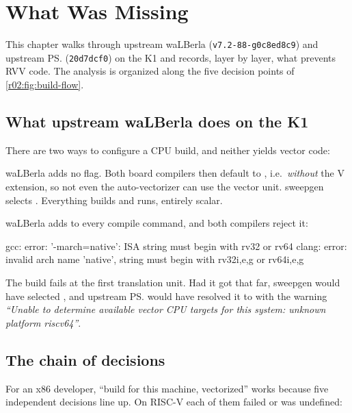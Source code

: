 \chapter{What Was Missing}\label{r02:ch:gap}

This chapter walks through upstream waLBerla (\texttt{v7.2-88-g0c8ed8c9}) and upstream
\ps{} (\texttt{20d7dcf0}) on the K1 and records, layer by layer, what prevents RVV code.
The analysis is organized along the five decision points of \cref{r02:fig:build-flow}.

\section{What upstream waLBerla does on the K1}\label{r02:sec:gap-behaviour}

There are two ways to configure a CPU build, and neither yields vector code:
\begin{description}[style=nextline]
  \item[\cmakeopt{WALBERLA_OPTIMIZE_FOR_LOCALHOST=OFF} (the default)] waLBerla adds no
     flag. Both board compilers then default to
    , i.e.\ \emph{without} the V extension, so not even
    the auto-vectorizer can use the vector unit. sweepgen selects
    . Everything builds and runs, entirely scalar.
  \item[\cmakeopt{WALBERLA_OPTIMIZE_FOR_LOCALHOST=ON}] waLBerla adds
     to every compile command, and both compilers reject it:
\begin{plaincode}
gcc:   error: '-march=native': ISA string must begin with rv32 or rv64
clang: error: invalid arch name 'native', string must begin with rv32{i,e,g} or rv64{i,e,g}
\end{plaincode}
    The build fails at the first translation unit. Had it got that far, sweepgen
    would have selected , and upstream \ps{} would have
    resolved it to  with the warning \emph{``Unable to determine
    available vector CPU targets for this system: unknown platform riscv64''}.
\end{description}

\section{The chain of decisions}\label{r02:sec:gap-chain}

For an x86 developer, ``build for this machine, vectorized'' works because five
independent decisions line up. On RISC-V each of them failed or was undefined:


